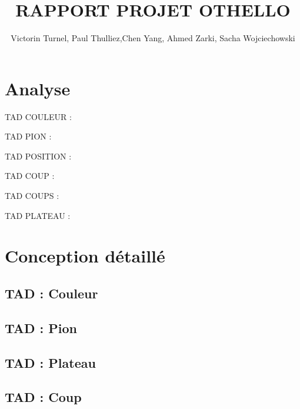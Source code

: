 \documentclass{article}
\title{RAPPORT PROJET OTHELLO}
\author{Victorin Turnel, Paul Thulliez,Chen Yang, Ahmed Zarki, Sacha Wojciechowski}
\begin{document}
\maketitle

\section{Analyse}

TAD COULEUR :



TAD PION :



TAD POSITION :



TAD COUP :




TAD COUPS :



TAD PLATEAU :



\section{Conception détaillé}

\subsection{TAD : Couleur}



\subsection{TAD : Pion}



\subsection{TAD : Plateau}



\subsection{TAD : Coup}















\end{document}
